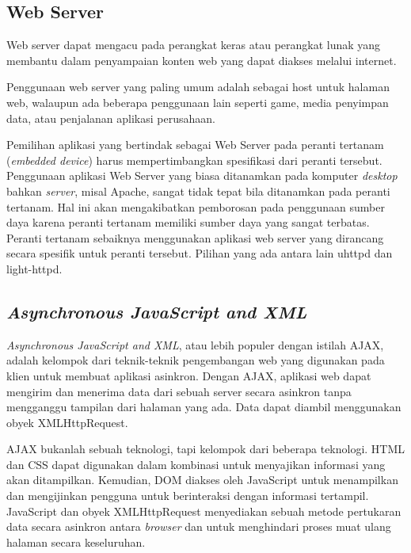  \subsection{Web Server}
    Web server dapat mengacu pada perangkat keras atau perangkat lunak yang membantu dalam penyampaian konten web yang dapat diakses melalui internet.

    Penggunaan web server yang paling umum adalah sebagai host untuk halaman web, walaupun ada beberapa penggunaan lain seperti game, media penyimpan data, atau penjalanan aplikasi perusahaan.

    Pemilihan aplikasi yang bertindak sebagai Web Server pada peranti tertanam (\emph{embedded device}) harus mempertimbangkan spesifikasi dari peranti tersebut. Penggunaan aplikasi Web Server yang biasa ditanamkan pada komputer \emph{desktop} bahkan \emph{server}, misal Apache, sangat tidak tepat bila ditanamkan pada peranti tertanam. Hal ini akan mengakibatkan pemborosan pada penggunaan sumber daya karena peranti tertanam memiliki sumber daya yang sangat terbatas. Peranti tertanam sebaiknya menggunakan aplikasi web server yang dirancang secara spesifik untuk peranti tersebut. Pilihan yang ada antara lain uhttpd dan light-httpd.


  \subsection{\emph{Asynchronous JavaScript and XML}}
    \emph{Asynchronous JavaScript and XML}, atau lebih populer dengan istilah AJAX, adalah kelompok dari teknik-teknik pengembangan web yang digunakan pada klien untuk membuat aplikasi asinkron. Dengan AJAX, aplikasi web dapat mengirim dan menerima data dari sebuah server secara asinkron tanpa mengganggu tampilan dari halaman yang ada. Data dapat diambil menggunakan obyek XMLHttpRequest.

    AJAX bukanlah sebuah teknologi, tapi kelompok dari beberapa teknologi. HTML dan CSS dapat digunakan dalam kombinasi untuk menyajikan informasi yang akan ditampilkan. Kemudian, DOM diakses oleh JavaScript untuk menampilkan dan mengijinkan pengguna untuk berinteraksi dengan informasi tertampil. JavaScript dan obyek XMLHttpRequest menyediakan sebuah metode pertukaran data secara asinkron antara \emph{browser} dan  untuk menghindari proses muat ulang halaman secara keseluruhan.


